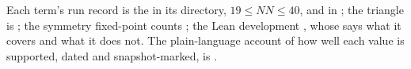 \documentclass[11pt]{article}
\begin{document}
Each term's run record is the  in its
 directory, $19 \le NN \le 40$, and in
; the triangle is
; the symmetry fixed-point counts
; the Lean development ,
whose  says what it covers and what it does not. The
plain-language account of how well each value is supported, dated and
snapshot-marked, is
.



\end{document}
